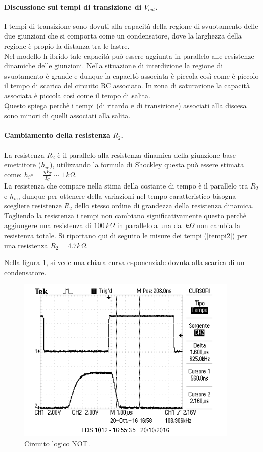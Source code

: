 \documentclass[10pt,a4paper]{article}
\begin{document}
\paragraph{Discussione sui tempi di transizione di $ V_{out}$.}
I tempi di transizione sono dovuti alla capacità della regione di svuotamento delle due giunzioni che si comporta come un condensatore, dove la larghezza della regione è propio la distanza tra le lastre. \\
Nel modello h-ibrido tale capacità può essere aggiunta in parallelo alle resistenze dinamiche delle giunzioni. Nella situazione di interdizione la regione di svuotamento è grande e dunque la capacitò associata è piccola così come è piccolo il tempo di scarica del circuito RC associato. In zona di saturazione la capacità associata è piccola così come il tempo di salita. 
\\Questo spiega perchè i tempi (di ritardo e di transizione) associati alla discesa sono minori di quelli associati alla salita.

\paragraph{Cambiamento della resistenza $R_2$.}
La resistenza $R_2$ è il parallelo alla resistenza dinamica della giunzione base emettitore ($h_{ie}$), utilizzando la formula di Shockley questa può essere stimata come: $h_ie = \frac{\eta V_T}{I_C} \sim 1 \, k \Omega$. \\
La resistenza che compare nella stima della costante di tempo è il parallelo tra $R_2$ e $h_{ie}$, dunque per ottenere della variazioni nel tempo caratteristico bisogna scegliere resistenze $R_2$ dello stesso ordine di grandezza della resistenza dinamica. \\
Togliendo la resistenza i tempi non cambiano significativamente questo perchè aggiungere una resistenza di $100 \, k\Omega$ in parallelo a una da $\ k\Omega$ non cambia la resistenza totale. Si riportano qui di seguito le misure dei tempi (\ref{tempi2}) per una resistenza $R_2 = 4.7 k\Omega$.

Nella figura \ref{condensatore}, si vede una chiara curva esponenziale dovuta alla scarica di un condensatore.\\

\begin{figure}[!htb]
  \centering
  \includegraphics[scale=0.7]{condensatore.png} 
\caption{Circuito logico NOT.} \label{condensatore}
\end{figure} 
\end{document}
